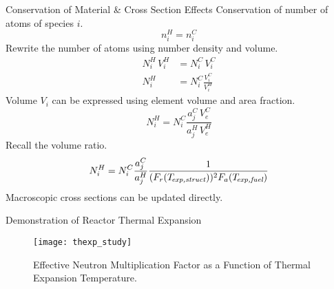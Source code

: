 \begin{frame}{Conservation of Material \& Cross Section Effects}
  Conservation of number of atoms of species $i$.
  \begin{equation}
    n_i^H = n_i^C
  \end{equation}
  Rewrite the number of atoms using number density and volume.
  \begin{align}
    N_i^H \, V_i^H &= N_i^C \, V_i^C \\
    N_i^H &= N_i^C \frac{V_i^C}{V_i^H}
  \end{align}
  Volume $V_i$ can be expressed using element volume and area fraction.
  \begin{equation}
    N_i^H = N_i^C \frac{a_j^C \, V_e^C}{a_j^H \, V_e^H}
  \end{equation}
  Recall the volume ratio.
  \begin{equation}
    N_i^H = N_i^C \frac{a_j^C}{a_j^H} 
      \frac{1}{(F_r(T_{\!\mbox{\scriptsize \em exp,struct}}))^2 F_a({T_{\!\mbox{\scriptsize \em exp,fuel}}})}
  \end{equation}
  Macroscopic cross sections can be updated directly.
\end{frame}

\begin{frame}{Demonstration of Reactor Thermal Expansion}
  \begin{figure}
    \centering
    \texttt{[image: thexp\_study]}
    \caption{Effective Neutron Multiplication Factor as a Function of 
      Thermal Expansion Temperature.}
    \label{fig:thexp_study}
  \end{figure}
\end{frame}
